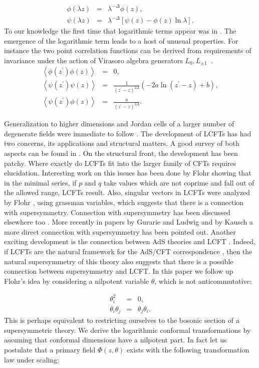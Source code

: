 \documentclass[a4paper,11pt]{article}
\begin{document}
\begin{eqnarray}
\phi(\lambda z)&=&\lambda^{-\Delta}\phi(z) ,\nonumber\\
\psi(\lambda z)&=&\lambda^{-\Delta}[\psi(z)-\phi(z)\ln \lambda] .
\end{eqnarray}
To our knowledge the first time that logarithmic terms appear was
in \cite{RS}. The emergence of the logarithmic term leads to a
host of unusual properties. For instance the two point correlation
functions can be derived from requirements of invariance under
the action of Virasoro algebra generators $L_{0},L_{\pm1}\:$
\cite{CKT}.
\begin{eqnarray}
\left<\phi(z^{\prime})\phi(z)\right>&=&0 ,\nonumber\\
\left<\psi(z^{\prime})\psi(z)\right>&=
&\frac{1}{(z^{\prime}-z)^{2\Delta}}(-2a\ln(z^{\prime}-z)+b) ,\nonumber\\
\left<\psi(z^{\prime})\phi(z)\right>&=&\frac{a}{(z^{\prime}-z)^{2\Delta}}
.
\end{eqnarray}

Generalization to higher dimensions and Jordan cells of a larger
number of degenerate fields were immediate to follow
\cite{GK,RAK}. The development of LCFTs has had two concerns, its
applications and structural matters. A good survey of both aspects
can be found in \cite{CAR,RAH}. On the structural front, the
development has been patchy. Where exactly do LCFTs fit into the
larger family of CFTs requires elucidation. Interesting work on
this issues has been done by Flohr \cite{Fl-CP1} showing that in
the minimal series, if $p$ and $q$ take values which are not
coprime and fall out of the allowed range, LCFTs result. Also,
singular vectors in LCFTs were analyzed by Flohr \cite{Fl-Sing},
using grassman variables, which suggests that there is a connection with
supersymmetry. Connection with supersymmetry has been discussed
elsewhere too \cite{MS}. More recently in papers by Gurarie and
Ludwig \cite{GL} and by Kausch \cite{Kausch} a more direct
connection with supersymmetry has been pointed out. Another
exciting development is the connection between AdS theories and
LCFT \cite{Ikogan}. Indeed, if LCFTs are the natural framework for
the AdS/CFT correspondence \cite{mald}, then the natural
supersymmetry of this theory also suggests that there is a
possible connection between supersymmetry and LCFT. In this paper
we follow up Flohr's \cite{Fl-Sing} idea by considering a nilpotent variable
$\theta$, which is not anticommutative:

\begin{eqnarray}
\theta_{i}^{2}&=&0 ,\nonumber\\
\theta_{i}\theta_{j}&=&\theta_{j}\theta_{i} .
\end{eqnarray}
This is perhaps equivalent to restricting ourselves to the bosonic
section of a supersymmetric theory. We derive the logarithmic
conformal transformations by assuming that conformal dimensions
have a nilpotent part. In fact let us postulate that a primary
field $\Phi(z,\theta)$ exists with the following transformation law
under scaling:
\end{document}
